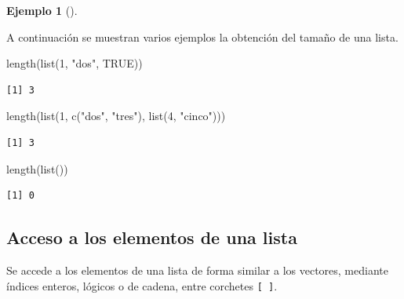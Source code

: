 \documentclass[
  a4paper,
]{scrreport}
\newenvironment{Shaded}{\begin{snugshade}}{\end{snugshade}}
\newcommand{\ConstantTok}[1]{\textcolor[rgb]{0.56,0.35,0.01}{#1}}
\newcommand{\DecValTok}[1]{\textcolor[rgb]{0.68,0.00,0.00}{#1}}
\newcommand{\FunctionTok}[1]{\textcolor[rgb]{0.28,0.35,0.67}{#1}}
\newcommand{\NormalTok}[1]{\textcolor[rgb]{0.00,0.23,0.31}{#1}}
\newcommand{\StringTok}[1]{\textcolor[rgb]{0.13,0.47,0.30}{#1}}
\theoremstyle{definition}
\theoremstyle{definition}
\newtheorem{example}{Ejemplo}[chapter]
\theoremstyle{remark}
\begin{document}
\leavevmode{}%
\begin{example}[]\label{exm-tamaño-lista}

A continuación se muestran varios ejemplos la obtención del tamaño de
una lista.

\begin{Shaded}
\begin{Highlighting}[]
\FunctionTok{length}\NormalTok{(}\FunctionTok{list}\NormalTok{(}\DecValTok{1}\NormalTok{, }\StringTok{"dos"}\NormalTok{, }\ConstantTok{TRUE}\NormalTok{))}
\end{Highlighting}
\end{Shaded}

\begin{verbatim}
[1] 3
\end{verbatim}

\begin{Shaded}
\begin{Highlighting}[]
\FunctionTok{length}\NormalTok{(}\FunctionTok{list}\NormalTok{(}\DecValTok{1}\NormalTok{, }\FunctionTok{c}\NormalTok{(}\StringTok{"dos"}\NormalTok{, }\StringTok{"tres"}\NormalTok{), }\FunctionTok{list}\NormalTok{(}\DecValTok{4}\NormalTok{, }\StringTok{"cinco"}\NormalTok{)))}
\end{Highlighting}
\end{Shaded}

\begin{verbatim}
[1] 3
\end{verbatim}

\begin{Shaded}
\begin{Highlighting}[]
\FunctionTok{length}\NormalTok{(}\FunctionTok{list}\NormalTok{())}
\end{Highlighting}
\end{Shaded}

\begin{verbatim}
[1] 0
\end{verbatim}

\end{example}

\hypertarget{acceso-a-los-elementos-de-una-lista}{%
\subsection{Acceso a los elementos de una
lista}\label{acceso-a-los-elementos-de-una-lista}}

Se accede a los elementos de una lista de forma similar a los vectores,
mediante índices enteros, lógicos o de cadena, entre corchetes
\texttt{{[}\ {]}}.
\end{document}
